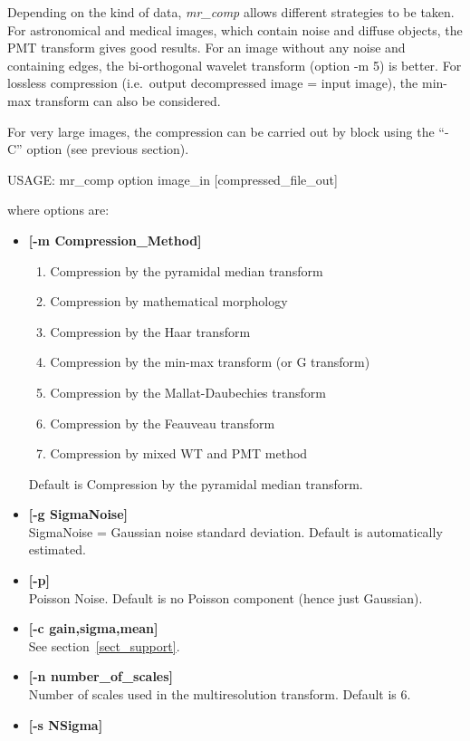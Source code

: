 Depending on the kind of data, {\em mr\_comp} allows different strategies
to be taken. For astronomical and medical 
images, which contain noise and diffuse
objects, the PMT transform gives good results. For an image without any noise
and containing edges, the bi-orthogonal wavelet transform (option -m 5)
is better. For  lossless compression (i.e.\ output decompressed image = 
input image), the min-max transform can also be considered.

For very large images, the compression can be carried out by block 
using the ``-C'' option (see previous section).   

{\bf
\begin{center}
 USAGE: mr\_comp option image\_in [compressed\_file\_out]
\end{center}}
where options are:
\begin{itemize}     
\baselineskip=0.4truecm
\item {\bf [-m Compression\_Method] }
\begin{enumerate}
\baselineskip=0.4truecm
\item Compression by the pyramidal median transform 
\item Compression by mathematical morphology             
\item Compression by the Haar transform 
\item Compression by the min-max transform (or G transform) 
\item Compression by the Mallat-Daubechies transform 
\item Compression by the Feauveau transform      
\item Compression by mixed WT and PMT method
\end{enumerate} 
Default is Compression by the pyramidal median transform.
\item {\bf [-g SigmaNoise]}  \\
SigmaNoise = Gaussian noise standard deviation. Default is automatically estimated.
\item {\bf [-p]} \\
Poisson Noise. Default is no Poisson component (hence just Gaussian).
\item {\bf [-c gain,sigma,mean]}  \\
See section~\ref{sect_support}.
\item {\bf [-n number\_of\_scales]}  \\
Number of scales used in the multiresolution transform. Default is 6.
\item {\bf [-s NSigma]}  \\

\end{itemize}
